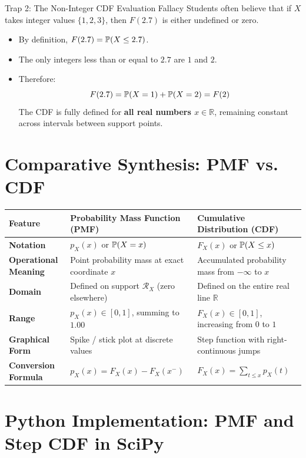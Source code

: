 \begin{trapbox}{Trap 2: The Non-Integer CDF Evaluation Fallacy}
Students often believe that if $X$ takes integer values $\{1, 2, 3\}$, then $F(2.7)$ is either undefined or zero.
\begin{itemize}
    \item By definition, $F(2.7) = \P(X \le 2.7)$.
    \item The only integers less than or equal to $2.7$ are $1$ and $2$.
    \item Therefore:
    $$F(2.7) = \P(X = 1) + \P(X = 2) = F(2)$$
    The CDF is fully defined for \textbf{all real numbers $x \in \mathbb{R}$}, remaining constant across intervals between support points.
\end{itemize}
\end{trapbox}

\section{Comparative Synthesis: PMF vs. CDF}

\begin{center}
\renewcommand{\arraystretch}{1.3}
\begin{tabular}{p{3.2cm}p{4.2cm}p{4.2cm}}
\toprule
\textbf{Feature} & \textbf{Probability Mass Function (PMF)} & \textbf{Cumulative Distribution (CDF)} \\
\midrule
\textbf{Notation} & $p_X(x)$ or $\P(X = x)$ & $F_X(x)$ or $\P(X \le x)$ \\
\textbf{Operational Meaning} & Point probability mass at exact coordinate $x$ & Accumulated probability mass from $-\infty$ to $x$ \\
\textbf{Domain} & Defined on support $\mathcal{R}_X$ (zero elsewhere) & Defined on the entire real line $\mathbb{R}$ \\
\textbf{Range} & $p_X(x) \in [0, 1]$, summing to $1.00$ & $F_X(x) \in [0, 1]$, increasing from $0$ to $1$ \\
\textbf{Graphical Form} & Spike / stick plot at discrete values & Step function with right-continuous jumps \\
\textbf{Conversion Formula} & $p_X(x) = F_X(x) - F_X(x^-)$ & $F_X(x) = \sum_{t \le x} p_X(t)$ \\
\bottomrule
\end{tabular}
\end{center}

\section{Python Implementation: PMF and Step CDF in SciPy}

